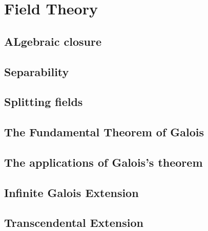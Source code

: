 \chapter{Field Theory}

\section{ALgebraic closure}

\section{Separability}

\section{Splitting fields}

\section{The Fundamental Theorem of Galois}

\section{The applications of Galois's theorem}

\section{Infinite Galois Extension}

\section{Transcendental Extension}
